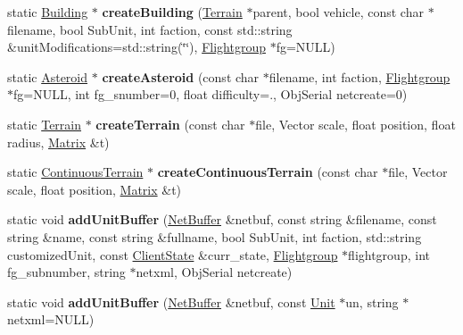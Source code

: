 \begin{DoxyCompactItemize}
\item 
static \hyperlink{classBuilding}{Building} $\ast$ {\bfseries create\+Building} (\hyperlink{classTerrain}{Terrain} $\ast$parent, bool vehicle, const char $\ast$filename, bool Sub\+Unit, int faction, const std\+::string \&unit\+Modifications=std\+::string(\char`\"{}\char`\"{}), \hyperlink{classFlightgroup}{Flightgroup} $\ast$fg=N\+U\+LL)\hypertarget{classUnitFactory_ac0016124083d287ab9e9ba178854568c}{}\label{classUnitFactory_ac0016124083d287ab9e9ba178854568c}

\item 
static \hyperlink{classAsteroid}{Asteroid} $\ast$ {\bfseries create\+Asteroid} (const char $\ast$filename, int faction, \hyperlink{classFlightgroup}{Flightgroup} $\ast$fg=N\+U\+LL, int fg\+\_\+snumber=0, float difficulty=., Obj\+Serial netcreate=0)\hypertarget{classUnitFactory_ab13d4427c3a7f1bd2e776b6a5e5ec567}{}\label{classUnitFactory_ab13d4427c3a7f1bd2e776b6a5e5ec567}

\item 
static \hyperlink{classTerrain}{Terrain} $\ast$ {\bfseries create\+Terrain} (const char $\ast$file, Vector scale, float position, float radius, \hyperlink{classMatrix}{Matrix} \&t)\hypertarget{classUnitFactory_a791eae9a9b1c5d8d01dad0d24b4c3eaf}{}\label{classUnitFactory_a791eae9a9b1c5d8d01dad0d24b4c3eaf}

\item 
static \hyperlink{classContinuousTerrain}{Continuous\+Terrain} $\ast$ {\bfseries create\+Continuous\+Terrain} (const char $\ast$file, Vector scale, float position, \hyperlink{classMatrix}{Matrix} \&t)\hypertarget{classUnitFactory_a2bf0c220f013aafd96518059126f0180}{}\label{classUnitFactory_a2bf0c220f013aafd96518059126f0180}

\item 
static void {\bfseries add\+Unit\+Buffer} (\hyperlink{classNetBuffer}{Net\+Buffer} \&netbuf, const string \&filename, const string \&name, const string \&fullname, bool Sub\+Unit, int faction, std\+::string customized\+Unit, const \hyperlink{classClientState}{Client\+State} \&curr\+\_\+state, \hyperlink{classFlightgroup}{Flightgroup} $\ast$flightgroup, int fg\+\_\+subnumber, string $\ast$netxml, Obj\+Serial netcreate)\hypertarget{classUnitFactory_a0c5cdfa16e34a3840145b14b9263ad81}{}\label{classUnitFactory_a0c5cdfa16e34a3840145b14b9263ad81}

\item 
static void {\bfseries add\+Unit\+Buffer} (\hyperlink{classNetBuffer}{Net\+Buffer} \&netbuf, const \hyperlink{classUnit}{Unit} $\ast$un, string $\ast$netxml=N\+U\+LL)\hypertarget{classUnitFactory_ab830a1e7a741ce6f8c32783b353a98f6}{}\label{classUnitFactory_ab830a1e7a741ce6f8c32783b353a98f6}


\end{DoxyCompactItemize}
